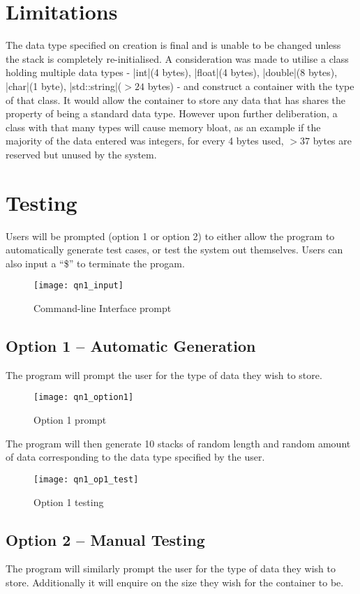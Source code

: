 \documentclass{report}
\begin{document}
\section{Limitations}
The data type specified on creation is final and is unable to be changed unless the stack is completely re-initialised. A consideration was made to utilise a class holding multiple data types - |int|(4 bytes), |float|(4 bytes), |double|(8 bytes), |char|(1 byte), |std::string|(\(>24\) bytes) - and construct a container with the type of that class. It would allow the container to store any data that has shares the property of being a standard data type. However upon further deliberation, a class with that many types will cause memory bloat, as an example if the majority of the data entered was integers, for every 4 bytes used, \(>37\) bytes are reserved but unused by the system.
\section{Testing}
Users will be prompted (option 1 or option 2) to either allow the program to automatically generate test cases, or test the system out themselves. Users can also input a ``\$'' to terminate the progam.
\begin{figure}[H]
	\centering
	\caption{Command-line Interface prompt}
	\texttt{[image: qn1\_input]}
	\label{fig:qn1_prompt}
\end{figure}
\subsection{Option 1 -- Automatic Generation}
The program will prompt the user for the type of data they wish to store.
\begin{figure}[H]
	\centering
	\caption{Option 1 prompt}
	\texttt{[image: qn1\_option1]}
	\label{fig:qn1_op1}
\end{figure}
The program will then generate 10 stacks of random length and random amount of data corresponding to the data type specified by the user.

\begin{figure}[H]
	\centering
	\caption{Option 1 testing}
	\texttt{[image: qn1\_op1\_test]}
	\label{fig:qn1_op1_test}
\end{figure}
\subsection{Option 2 -- Manual Testing}
The program will similarly prompt the user for the type of data they wish to store. Additionally it will enquire on the size they wish for the container to be.
\end{document}
